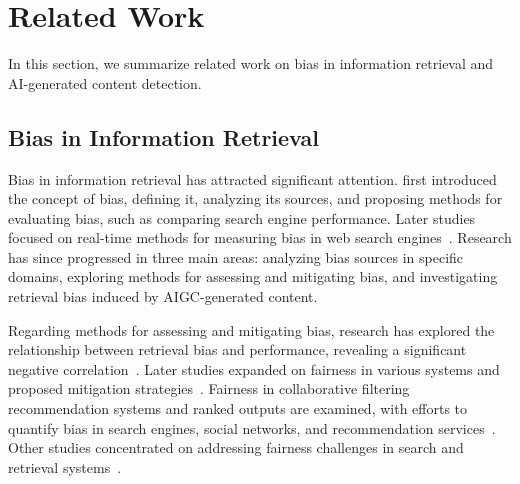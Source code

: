 \section{Related Work}
\label{sec:6}
In this section, we summarize related work on bias in information retrieval and AI-generated content detection.
\subsection{Bias in Information Retrieval}
\label{sec:6.1}

Bias in information retrieval has attracted significant attention. \cite{mowshowitz2002assessing} first introduced the concept of bias, defining it, analyzing its sources, and proposing methods for evaluating bias, such as comparing search engine performance. Later studies focused on real-time methods for measuring bias in web search engines~\cite{mowshowitz2005measuring}. Research has since progressed in three main areas: analyzing bias sources in specific domains, exploring methods for assessing and mitigating bias, and investigating retrieval bias induced by AIGC-generated content.


Regarding methods for assessing and mitigating bias, research has explored the relationship between retrieval bias and performance, revealing a significant negative correlation~\cite{wilkie2014retrievability}. Later studies expanded on fairness in various systems and proposed mitigation strategies~\cite{yao2017new, yang2017measuring, geyik2019fairness}. Fairness in collaborative filtering recommendation systems and ranked outputs are examined, with efforts to quantify bias in search engines, social networks, and recommendation services~\cite{pitoura2018measuring}. Other studies concentrated on addressing fairness challenges in search and retrieval systems~\cite{gao2021addressing, gao2021toward}.

